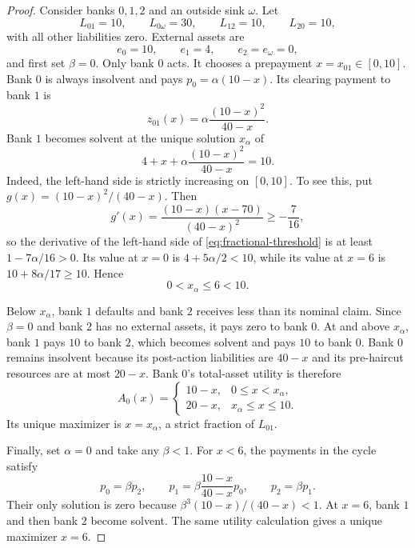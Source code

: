 \documentclass[11pt]{article}
\theoremstyle{definition}
\theoremstyle{remark}
\begin{document}
\begin{proof}
Consider banks $0,1,2$ and an outside sink $\omega$.  Let
\begin{equation}
  L_{01}=10,
  \qquad L_{0\omega}=30,
  \qquad L_{12}=10,
  \qquad L_{20}=10,
\end{equation}
with all other liabilities zero.  External assets are
\begin{equation}
  e_0=10,
  \qquad e_1=4,
  \qquad e_2=e_\omega=0,
\end{equation}
and first set $\beta=0$.  Only bank $0$ acts.  It chooses a prepayment
$x=x_{01}\in[0,10]$.  Bank $0$ is always insolvent and pays
$p_0=\alpha(10-x)$.  Its clearing payment to bank $1$ is
\begin{equation}
  z_{01}(x)
  =\alpha\frac{(10-x)^2}{40-x}.
\end{equation}
Bank $1$ becomes solvent at the unique solution $x_\alpha$ of
\begin{equation}\label{eq:fractional-threshold}
  4+x+\alpha\frac{(10-x)^2}{40-x}=10.
\end{equation}
Indeed, the left-hand side is strictly increasing on $[0,10]$.  To see this,
put $g(x)=(10-x)^2/(40-x)$.  Then
\begin{equation}
  g'(x)=\frac{(10-x)(x-70)}{(40-x)^2}
  \geq-\frac{7}{16},
\end{equation}
so the derivative of the left-hand side of
\eqref{eq:fractional-threshold} is at least $1-7\alpha/16>0$.  Its value at
$x=0$ is $4+5\alpha/2<10$, while its value at $x=6$ is
$10+8\alpha/17\geq10$.  Hence
\begin{equation}
  0<x_\alpha\leq6<10.
\end{equation}

Below $x_\alpha$, bank $1$ defaults and bank $2$ receives less than its
nominal claim.  Since $\beta=0$ and bank $2$ has no external assets, it pays
zero to bank $0$.  At and above $x_\alpha$, bank $1$ pays $10$ to bank $2$,
which becomes solvent and pays $10$ to bank $0$.  Bank $0$ remains insolvent
because its post-action liabilities are $40-x$ and its pre-haircut resources
are at most $20-x$.  Bank $0$'s total-asset utility is therefore
\begin{equation}
  A_0(x)=
  \begin{cases}
    10-x, & 0\leq x<x_\alpha,\\
    20-x, & x_\alpha\leq x\leq10.
  \end{cases}
\end{equation}
Its unique maximizer is $x=x_\alpha$, a strict fraction of $L_{01}$.

Finally, set $\alpha=0$ and take any $\beta<1$.  For $x<6$, the payments in
the cycle satisfy
\begin{equation}
  p_0=\beta p_2,
  \qquad
  p_1=\beta\frac{10-x}{40-x}p_0,
  \qquad
  p_2=\beta p_1.
\end{equation}
Their only solution is zero because
$\beta^3(10-x)/(40-x)<1$.  At $x=6$, bank $1$ and then bank $2$ become
solvent.  The same utility calculation gives a unique maximizer $x=6$.
\end{proof}
\end{document}
